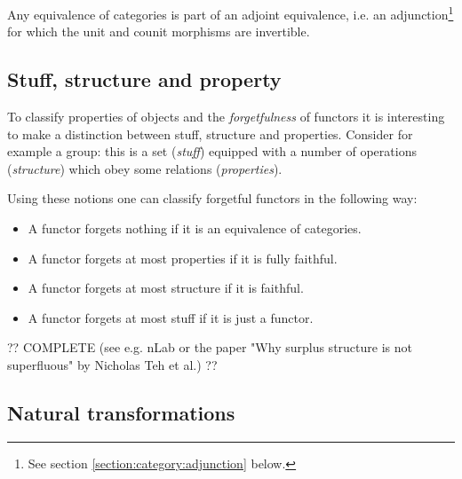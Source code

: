     \begin{property}
        Any equivalence of categories is part of an adjoint equivalence, i.e. an adjunction\footnote{See section \ref{section:category:adjunction} below.} for which the unit and counit morphisms are invertible.
    \end{property}

\subsection{Stuff, structure and property}

    To classify properties of objects and the \textit{forgetfulness} of functors it is interesting to make a distinction between stuff, structure and properties. Consider for example a group: this is a set (\textit{stuff}) equipped with a number of operations (\textit{structure}) which obey some relations (\textit{properties}).

    Using these notions one can classify forgetful functors in the following way:
    \begin{itemize}
        \item A functor forgets nothing if it is an equivalence of categories.
        \item A functor forgets at most properties if it is fully faithful.
        \item A functor forgets at most structure if it is faithful.
        \item A functor forgets at most stuff if it is just a functor.
    \end{itemize}

    ?? COMPLETE (see e.g. nLab or the paper "Why surplus structure is not superfluous" by Nicholas Teh et al.) ??

\subsection{Natural transformations}

